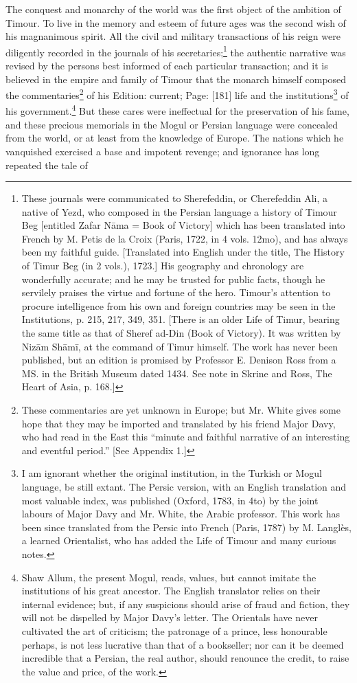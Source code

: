 The conquest and monarchy of the world was the first object of the ambition of Timour. To live in the memory and esteem of future ages was the second wish of his magnanimous spirit. All the civil and military transactions of his reign were diligently recorded in the journals of his secretaries;\footnote{These journals were communicated to Sherefeddin, or Cherefeddin Ali, a native of Yezd, who composed in the Persian language a history of Timour Beg [entitled Zafar Nāma = Book of Victory] which has been translated into French by M. Petis de la Croix (Paris, 1722, in 4 vols. 12mo), and has always been my faithful guide. [Translated into English under the title, The History of Timur Beg (in 2 vols.), 1723.] His geography and chronology are wonderfully accurate; and he may be trusted for public facts, though he servilely praises the virtue and fortune of the hero. Timour\texthebrew{}’s attention to procure intelligence from his own and foreign countries may be seen in the Institutions, p. 215, 217, 349, 351. [There is an older Life of Timur, bearing the same title as that of Sheref ad-Din (Book of Victory). It was written by Nizām Shāmī, at the command of Timur himself. The work has never been published, but an edition is promised by Professor E. Denison Ross from a MS. in the British Museum dated 1434. See note in Skrine and Ross, The Heart of Asia, p. 168.]} the authentic narrative was revised by the persons best informed of each particular transaction; and it is believed in the empire and family of Timour that the monarch himself composed the commentaries\footnote{These commentaries are yet unknown in Europe; but Mr. White gives some hope that they may be imported and translated by his friend Major Davy, who had read in the East this \texthebrew{“}minute and faithful narrative of an interesting and eventful period.\texthebrew{}” [See Appendix 1.]} of his Edition: current; Page: [181] life and the institutions\footnote{I am ignorant whether the original institution, in the Turkish or Mogul language, be still extant. The Persic version, with an English translation and most valuable index, was published (Oxford, 1783, in 4to) by the joint labours of Major Davy and Mr. White, the Arabic professor. This work has been since translated from the Persic into French (Paris, 1787) by M. Langlès, a learned Orientalist, who has added the Life of Timour and many curious notes.} of his government.\footnote{Shaw Allum, the present Mogul, reads, values, but cannot imitate the institutions of his great ancestor. The English translator relies on their internal evidence; but, if any suspicions should arise of fraud and fiction, they will not be dispelled by Major Davy\texthebrew{}’s letter. The Orientals have never cultivated the art of criticism; the patronage of a prince, less honourable perhaps, is not less lucrative than that of a bookseller; nor can it be deemed incredible that a Persian, the real author, should renounce the credit, to raise the value and price, of the work.} But these cares were ineffectual for the preservation of his fame, and these precious memorials in the Mogul or Persian language were concealed from the world, or at least from the knowledge of Europe. The nations which he vanquished exercised a base and impotent revenge; and ignorance has long repeated the tale of 